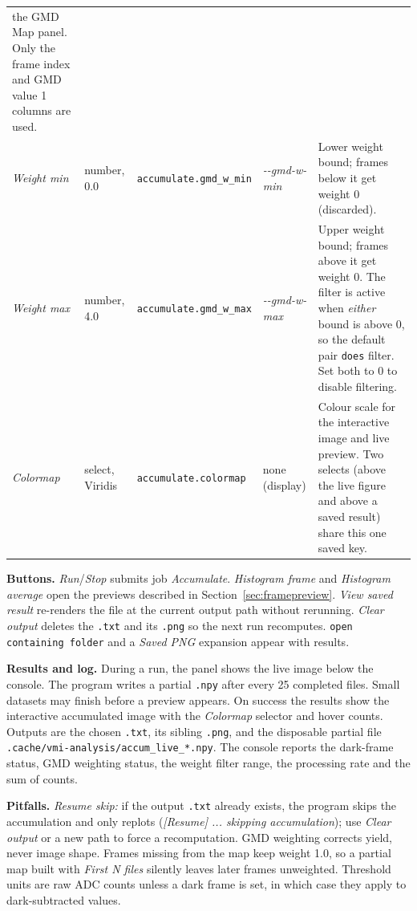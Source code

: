 \documentclass[11pt,a4paper]{article}
\newcommand{\code}[1]{\texttt{#1}}
\begin{document}
\begin{center}
\begin{longtable}{@{}L{3.4cm}L{2.3cm}L{2.5cm}L{2.8cm}L{4.9cm}@{}}
the GMD Map panel. Only the frame index and GMD value 1 columns are used. \\
\addlinespace
\emph{Weight min} & number, 0.0 & \code{accumulate.\allowbreak{}gmd\_\allowbreak{}w\_\allowbreak{}min} &
\emph{-\allowbreak{}-\allowbreak{}gmd-\allowbreak{}w-\allowbreak{}min} & Lower weight bound; frames below it get weight 0
(discarded). \\
\addlinespace
\emph{Weight max} & number, 4.0 & \code{accumulate.\allowbreak{}gmd\_\allowbreak{}w\_\allowbreak{}max} &
\emph{-\allowbreak{}-\allowbreak{}gmd-\allowbreak{}w-\allowbreak{}max} & Upper weight bound; frames above it get weight 0. The
filter is active when \emph{either} bound is above 0, so the default pair
\code{does} filter. Set both to 0 to disable filtering. \\
\addlinespace
\emph{Colormap} & select, Viridis & \code{accumulate.\allowbreak{}colormap} &
none (display) & Colour scale for the interactive image and live preview.
Two selects (above the live figure and above a saved result) share this one
saved key. \\
\end{longtable}
\end{center}

\textbf{Buttons.} \emph{Run}/\emph{Stop} submits job \emph{Accumulate}.
\emph{Histogram frame} and \emph{Histogram average} open the previews
described in Section~\ref{sec:framepreview}. \emph{View saved result} re-renders the file
at the current output path without rerunning. \emph{Clear output} deletes the
\code{.txt} and its \code{.\allowbreak{}png} so the next run recomputes.
\code{open containing folder} and a \emph{Saved PNG} expansion appear with
results.

\textbf{Results and log.} During a run, the panel shows the live image below
the console. The program writes a partial \code{.\allowbreak{}npy} after every
25 completed files. Small datasets may finish before a preview appears. On success the results show the interactive accumulated
image with the \emph{Colormap} selector and hover counts. Outputs are the
chosen \code{.\allowbreak{}txt}, its sibling \code{.\allowbreak{}png}, and the disposable partial
file \code{.\allowbreak{}cache/\allowbreak{}vmi-\allowbreak{}analysis/\allowbreak{}accum\_\allowbreak{}live\_\allowbreak{}*.\allowbreak{}npy}. The console reports the
dark-frame status, GMD weighting status, the weight filter range, the
processing rate and the sum of counts.

\textbf{Pitfalls.} \emph{Resume skip:} if the output \code{.\allowbreak{}txt} already
exists, the program skips the accumulation and only replots
(\emph{[Resume] ... skipping accumulation}); use \emph{Clear output} or a new
path to force a recomputation. GMD weighting corrects yield, never image
shape. Frames missing from the map keep weight 1.0, so a partial map built
with \emph{First N files} silently leaves later frames unweighted. Threshold
units are raw ADC counts unless a dark frame is set, in which case they apply
to dark-subtracted values.
\end{document}
